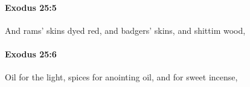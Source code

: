 		\paragraph{Exodus 25:5} %
			\label{EXODUS-25-5}

			And rams' skins dyed red, and badgers' skins, and shittim wood,


		\paragraph{Exodus 25:6} %
			\label{EXODUS-25-6}

			Oil for the light, spices for anointing oil, and for sweet incense,


